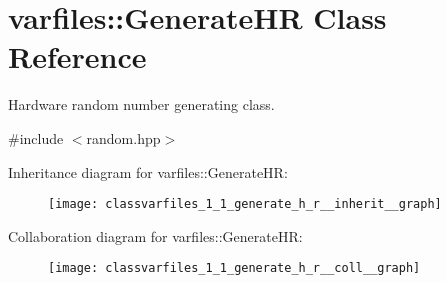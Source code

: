 \hypertarget{classvarfiles_1_1_generate_h_r}{}\section{varfiles\+:\+:Generate\+HR Class Reference}
\label{classvarfiles_1_1_generate_h_r}


Hardware random number generating class.  




{\ttfamily \#include $<$random.\+hpp$>$}



Inheritance diagram for varfiles\+:\+:Generate\+HR\+:\nopagebreak
\begin{figure}[H]
\begin{center}
\leavevmode
\texttt{[image: classvarfiles\_1\_1\_generate\_h\_r\_\_inherit\_\_graph]}
\end{center}
\end{figure}


Collaboration diagram for varfiles\+:\+:Generate\+HR\+:\nopagebreak
\begin{figure}[H]
\begin{center}
\leavevmode
\texttt{[image: classvarfiles\_1\_1\_generate\_h\_r\_\_coll\_\_graph]}
\end{center}
\end{figure}
